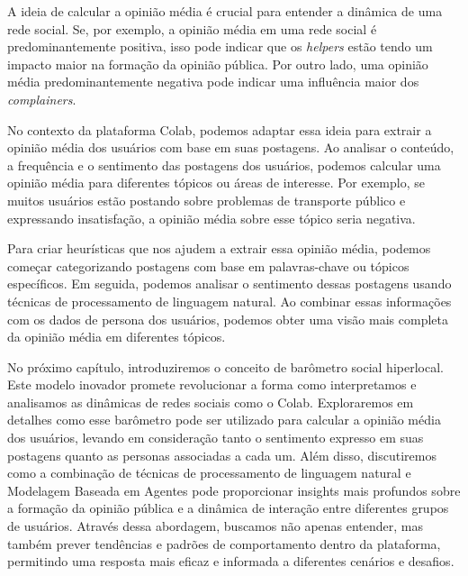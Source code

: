 A ideia de calcular a opinião média é crucial para entender a dinâmica de uma rede social. Se, por exemplo, a opinião média em uma rede social é predominantemente positiva, isso pode indicar que os \textit{helpers} estão tendo um impacto maior na formação da opinião pública. Por outro lado, uma opinião média predominantemente negativa pode indicar uma influência maior dos \textit{complainers}.

No contexto da plataforma Colab, podemos adaptar essa ideia para extrair a opinião média dos usuários com base em suas postagens. Ao analisar o conteúdo, a frequência e o sentimento das postagens dos usuários, podemos calcular uma opinião média para diferentes tópicos ou áreas de interesse. Por exemplo, se muitos usuários estão postando sobre problemas de transporte público e expressando insatisfação, a opinião média sobre esse tópico seria negativa.

Para criar heurísticas que nos ajudem a extrair essa opinião média, podemos começar categorizando postagens com base em palavras-chave ou tópicos específicos. Em seguida, podemos analisar o sentimento dessas postagens usando técnicas de processamento de linguagem natural. Ao combinar essas informações com os dados de persona dos usuários, podemos obter uma visão mais completa da opinião média em diferentes tópicos.

No próximo capítulo, introduziremos o conceito de barômetro social hiperlocal. Este modelo inovador promete revolucionar a forma como interpretamos e analisamos as dinâmicas de redes sociais como o Colab. Exploraremos em detalhes como esse barômetro pode ser utilizado para calcular a opinião média dos usuários, levando em consideração tanto o sentimento expresso em suas postagens quanto as personas associadas a cada um. Além disso, discutiremos como a combinação de técnicas de processamento de linguagem natural e Modelagem Baseada em Agentes pode proporcionar insights mais profundos sobre a formação da opinião pública e a dinâmica de interação entre diferentes grupos de usuários. Através dessa abordagem, buscamos não apenas entender, mas também prever tendências e padrões de comportamento dentro da plataforma, permitindo uma resposta mais eficaz e informada a diferentes cenários e desafios.